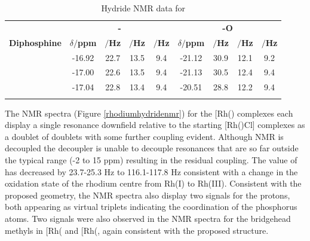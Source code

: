 \begin{table}
\caption[Hydride \proton{} NMR data for \ce{[Rh(\POP)Cl(H)2]}]{Hydride \proton{} NMR data for \texorpdfstring{\ce{[Rh(\POP)Cl(H)2]}}R}
\vspace{1em}
\label{table:dihydrides}
\small
\begin{center}
\begin{tabular}{c c c c c c c c c}
\toprule{}
	~~ & \multicolumn{4}{c}{\bfseries{\ce{H-} \trans-\ce{Cl-}}} & \multicolumn{4}{c}{\bfseries{\ce{H-} \trans-O}}\\
	\bfseries{Diphosphine}&\bfseries{$\delta/$ppm}&\bfseries{\JRhH$/$Hz}&\bfseries{\JPH$/$Hz}&\bfseries{\JHH$/$Hz}&\bfseries{$\delta/$ppm}&\bfseries{\JRhH$/$Hz}&\bfseries{\JPH$/$Hz}&\bfseries{\JHH$/$Hz}\\
	\midrule{}
	\tBuSixantphos & -16.92 & 22.7 & 13.5 & 9.4 & -21.12 & 30.9 & 12.1 & 9.2 \\
	\tBuThixantphos & -17.00 & 22.6 & 13.5 & 9.4 & -21.13 & 30.5 & 12.4 & 9.4 \\
	\tBuXantphos & -17.04 & 22.8 & 13.4 & 9.4 & -20.51 & 28.8 & 12.2 & 9.4 \\
	\bottomrule{}
\end{tabular}
\end{center} 
\end{table}

The \phosphorus{} NMR spectra (Figure \ref{rhodiumhydridenmr}) for the [Rh(\tBuxantphosk)\ce{(H)2Cl]} complexes each display a single resonance downfield relative to the starting [Rh(\tBuxantphosk)Cl] complexes as a doublet of doublets with some further coupling evident.  Although \phosphorus{} NMR is \proton{} decoupled the decoupler is unable to decouple resonances that are so far outside the typical \proton{} range (-2 to 15 ppm) resulting in the residual coupling.  The value of \JRhP{} has decreased by 23.7-25.3 Hz to 116.1-117.8 Hz consistent with a change in the oxidation state of the rhodium centre from Rh(I) to Rh(III).  Consistent with the proposed geometry, the \proton{} NMR spectra also display two signals for the \tBu{} protons, both appearing as virtual triplets indicating the \trans{} coordination of the phosphorus atoms.  Two signals were also observed in the \proton{} NMR spectra for the bridgehead methyls in [Rh(\tBuxantphosk\ce{)(H)2Cl]} and [Rh(\tBusixantphosk\ce{)(H)2Cl]}, again consistent with the proposed structure.  

